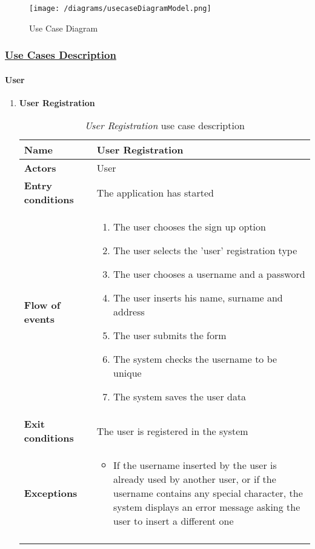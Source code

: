 		\begin{figure}[h]
			\centering
			\texttt{[image: /diagrams/usecaseDiagramModel.png]}
			\caption{Use Case Diagram}
		\end{figure}
	
	\subsubsection[Use Cases Description]{\hyperlink{toc}{Use Cases Description}}
		\label{sec:useCases}
		
		\paragraph{User}
		\begin{enumerate}
			\item \textbf{User Registration} 
				\begin{longtable}{p{0.25\linewidth}p{0.75\linewidth}}
					\toprule
					\textbf{Name} & \textbf{User Registration} \\
					\midrule
					\textbf{Actors} & User \\
					\midrule
					\textbf{Entry conditions} & The application has started \\
					\midrule
					\textbf{Flow of events} & 
					\begin{enumerate}
						\item The user chooses the sign up option
						\item The user selects the 'user' registration type
						\item The user chooses a username and a password
						\item The user inserts his name, surname and address
						\item The user submits the form
						\item The system checks the username to be unique
						\item The system saves the user data
					\end{enumerate} \\
					\midrule
					\textbf{Exit conditions} & The user is registered in the system\\
					\midrule
					\textbf{Exceptions} & 
					\begin{itemize}
						\item If the username inserted by the user is already used by another user, or if the username contains any special character, the system displays an error message asking the user to insert a different one
					\end{itemize} \\
					\bottomrule
					\caption{\emph{User Registration} use case description}
				\end{longtable}
			

\end{enumerate}
